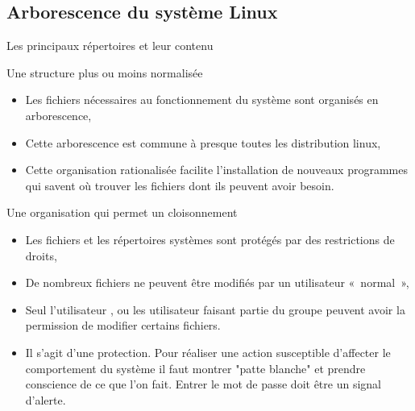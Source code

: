 \subsection{Arborescence du système Linux}
\begin{frame}{Les principaux répertoires et leur contenu}
  \begin{block}{Une structure plus ou moins normalisée}
    \begin{itemize}
    \item Les fichiers nécessaires au fonctionnement du système sont organisés
      en arborescence,
    \item Cette arborescence est commune à presque toutes les distribution
      linux,
    \item Cette organisation rationalisée facilite l'installation de nouveaux
      programmes qui savent où trouver les fichiers dont ils peuvent avoir
      besoin.
    \end{itemize}
  \end{block}
  \begin{block}{Une organisation qui permet un cloisonnement}
    \begin{itemize}
    \item Les fichiers et les répertoires systèmes sont protégés par des
      restrictions de droits,
    \item De nombreux fichiers ne peuvent être modifiés par un utilisateur
      «~normal~»,
    \item Seul l'utilisateur , ou les utilisateur faisant partie du
      groupe  peuvent avoir la permission de modifier certains
      fichiers.
    \item Il s'agit d'une protection. Pour réaliser une action susceptible
      d'affecter le comportement du système il faut montrer "patte blanche" et
      prendre conscience de ce que l'on fait. Entrer le mot de passe
       doit être un signal d'alerte.
    \end{itemize}
  \end{block}
\end{frame}


